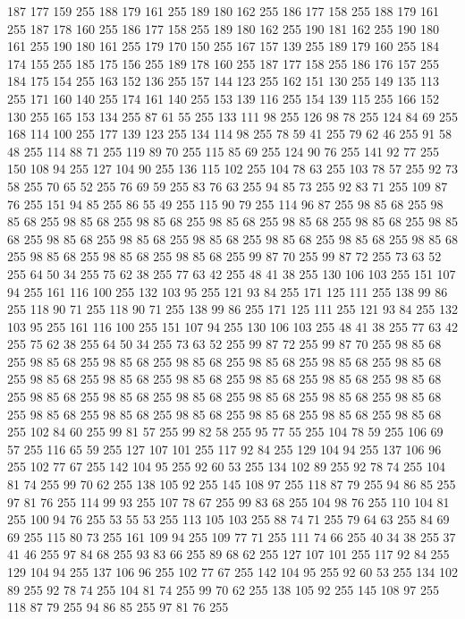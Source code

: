187 177 159 255 188 179 161 255 189 180 162 255 186 177 158 255 188 179 161 255 187 178 160 255 186 177 158 255 189 180 162 255 190 181 162 255 190 180 161 255 190 180 161 255 179 170 150 255 167 157 139 255 189 179 160 255 184 174 155 255 185 175 156 255 189 178 160 255 187 177 158 255 186 176 157 255 184 175 154 255 163 152 136 255 157 144 123 255 162 151 130 255 149 135 113 255 171 160 140 255 174 161 140 255 153 139 116 255 154 139 115 255 166 152 130 255 165 153 134 255 87 61 55 255 133 111 98 255 126 98 78 255 124 84 69 255 168 114 100 255 177 139 123 255 134 114 98 255 78 59 41 255 79 62 46 255 91 58 48 255 114 88 71 255 119 89 70 255 115 85 69 255 124 90 76 255 141 92 77 255 150 108 94 255 127 104 90 255 136 115 102 255 104 78 63 255 103 78 57 255 92 73 58 255 70 65 52 255 76 69 59 255 83 76 63 255 94 85 73 255 92 83 71 255 109 87 76 255 151 94 85 255 86 55 49 255 115 90 79 255 114 96 87 255 98 85 68 255 98 85 68 255 98 85 68 255
98 85 68 255 98 85 68 255 98 85 68 255 98 85 68 255 98 85 68 255 98 85 68 255 98 85 68 255 98 85 68 255 98 85 68 255 98 85 68 255 98 85 68 255 98 85 68 255 98 85 68 255 98 85 68 255 99 87 70 255 99 87 72 255 73 63 52 255 64 50 34 255 75 62 38 255 77 63 42 255 48 41 38 255 130 106 103 255 151 107 94 255 161 116 100 255 132 103 95 255 121 93 84 255 171 125 111 255 138 99 86 255 118 90 71 255 118 90 71 255 138 99 86 255 171 125 111 255 121 93 84 255 132 103 95 255 161 116 100 255 151 107 94 255 130 106 103 255 48 41 38 255 77 63 42 255 75 62 38 255 64 50 34 255 73 63 52 255 99 87 72 255 99 87 70 255 98 85 68 255 98 85 68 255 98 85 68 255 98 85 68 255 98 85 68 255 98 85 68 255 98 85 68 255 98 85 68 255 98 85 68 255 98 85 68 255 98 85 68 255 98 85 68 255 98 85 68 255 98 85 68 255 98 85 68 255 98 85 68 255 98 85 68 255 98 85 68 255 98 85 68 255 98 85 68 255
98 85 68 255 98 85 68 255 98 85 68 255 98 85 68 255 98 85 68 255 102 84 60 255 99 81 57 255 99 82 58 255 95 77 55 255 104 78 59 255 106 69 57 255 116 65 59 255 127 107 101 255 117 92 84 255 129 104 94 255 137 106 96 255 102 77 67 255 142 104 95 255 92 60 53 255 134 102 89 255 92 78 74 255 104 81 74 255 99 70 62 255 138 105 92 255 145 108 97 255 118 87 79 255 94 86 85 255 97 81 76 255 114 99 93 255 107 78 67 255 99 83 68 255 104 98 76 255 110 104 81 255 100 94 76 255 53 55 53 255 113 105 103 255 88 74 71 255 79 64 63 255 84 69 69 255 115 80 73 255 161 109 94 255 109 77 71 255 111 74 66 255 40 34 38 255 37 41 46 255 97 84 68 255 93 83 66 255 89 68 62 255 127 107 101 255 117 92 84 255 129 104 94 255 137 106 96 255 102 77 67 255 142 104 95 255 92 60 53 255 134 102 89 255 92 78 74 255 104 81 74 255 99 70 62 255 138 105 92 255 145 108 97 255 118 87 79 255 94 86 85 255 97 81 76 255
